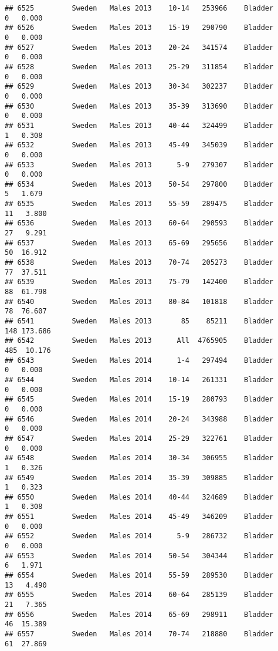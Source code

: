 \documentclass[
]{article}
\begin{document}
\begin{verbatim}
## 6525         Sweden   Males 2013    10-14   253966    Bladder      0   0.000
## 6526         Sweden   Males 2013    15-19   290790    Bladder      0   0.000
## 6527         Sweden   Males 2013    20-24   341574    Bladder      0   0.000
## 6528         Sweden   Males 2013    25-29   311854    Bladder      0   0.000
## 6529         Sweden   Males 2013    30-34   302237    Bladder      0   0.000
## 6530         Sweden   Males 2013    35-39   313690    Bladder      0   0.000
## 6531         Sweden   Males 2013    40-44   324499    Bladder      1   0.308
## 6532         Sweden   Males 2013    45-49   345039    Bladder      0   0.000
## 6533         Sweden   Males 2013      5-9   279307    Bladder      0   0.000
## 6534         Sweden   Males 2013    50-54   297800    Bladder      5   1.679
## 6535         Sweden   Males 2013    55-59   289475    Bladder     11   3.800
## 6536         Sweden   Males 2013    60-64   290593    Bladder     27   9.291
## 6537         Sweden   Males 2013    65-69   295656    Bladder     50  16.912
## 6538         Sweden   Males 2013    70-74   205273    Bladder     77  37.511
## 6539         Sweden   Males 2013    75-79   142400    Bladder     88  61.798
## 6540         Sweden   Males 2013    80-84   101818    Bladder     78  76.607
## 6541         Sweden   Males 2013       85    85211    Bladder    148 173.686
## 6542         Sweden   Males 2013      All  4765905    Bladder    485  10.176
## 6543         Sweden   Males 2014      1-4   297494    Bladder      0   0.000
## 6544         Sweden   Males 2014    10-14   261331    Bladder      0   0.000
## 6545         Sweden   Males 2014    15-19   280793    Bladder      0   0.000
## 6546         Sweden   Males 2014    20-24   343988    Bladder      0   0.000
## 6547         Sweden   Males 2014    25-29   322761    Bladder      0   0.000
## 6548         Sweden   Males 2014    30-34   306955    Bladder      1   0.326
## 6549         Sweden   Males 2014    35-39   309885    Bladder      1   0.323
## 6550         Sweden   Males 2014    40-44   324689    Bladder      1   0.308
## 6551         Sweden   Males 2014    45-49   346209    Bladder      0   0.000
## 6552         Sweden   Males 2014      5-9   286732    Bladder      0   0.000
## 6553         Sweden   Males 2014    50-54   304344    Bladder      6   1.971
## 6554         Sweden   Males 2014    55-59   289530    Bladder     13   4.490
## 6555         Sweden   Males 2014    60-64   285139    Bladder     21   7.365
## 6556         Sweden   Males 2014    65-69   298911    Bladder     46  15.389
## 6557         Sweden   Males 2014    70-74   218880    Bladder     61  27.869

\end{verbatim}
\end{document}
